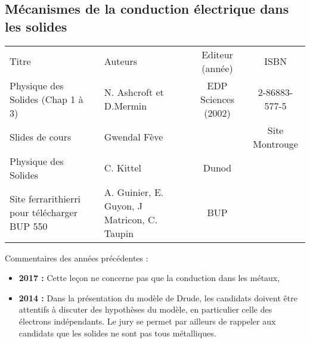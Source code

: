 \begin{headerBlock}
  \chapter{Mécanismes de la conduction électrique dans les solides}
    \label{LP_Conduction}
\end{headerBlock}

\begin{center}
\begin{tabularx}{\textwidth}{| X | X | c | c |}
  \hline
  \rowcolor{gray!20}\multicolumn{4}{c}{Bibliographie de la leçon : } \\
  \hline 
  Titre & Auteurs & Editeur (année) & ISBN \\
  \hline
Physique des Solides (Chap 1 à 3)  & N. Ashcroft et D.Mermin   &  EDP Sciences (2002) & 2-86883-577-5  \\
  \hline 
     Slides de cours & Gwendal Fève &  &  Site Montrouge \\
  \hline 
  Physique des Solides & C. Kittel &  Dunod &  \\
\hline
Site ferrarithierri pour télécharger BUP 550 & A. Guinier, E. Guyon, J Matricon, C. Taupin & BUP & \\
\hline 
\end{tabularx}
\end{center}

\begin{reportBlock}{Commentaires des années précédentes :}
    \begin{itemize}
        \item \textbf{2017 :} Cette leçon ne concerne pas que la conduction dans les métaux,
        \item \textbf{2014 :} Dans la présentation du modèle de Drude, les candidats doivent être attentifs à discuter des hypothèses du modèle, en particulier celle des électrons indépendants. Le jury se permet par ailleurs de rappeler aux candidats que les solides ne sont pas tous métalliques.
    \end{itemize}
\end{reportBlock}


